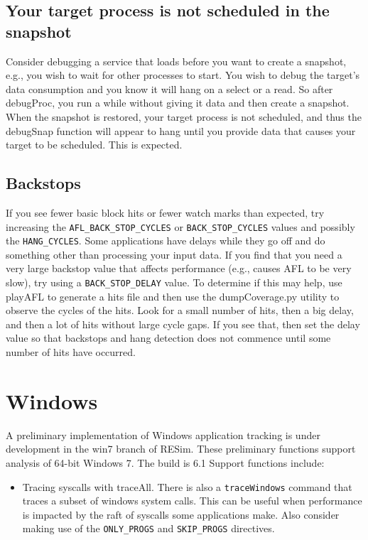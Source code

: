 \documentclass[titlepage]{article}
\begin{document}
\begin{appendices}
\subsection{Your target process is not scheduled in the snapshot}
Consider debugging a service that loads before you want to create a snapshot, e.g., you wish to wait for other processes to start.
You wish to debug the target's data consumption and you know it will hang on a select or a read. So after debugProc, 
you run a while without giving it data and then create a snapshot.  When the snapshot
is restored, your target process is not scheduled, and thus the debugSnap function will appear to hang until you provide data that causes your
target to be scheduled.  This is expected.

\subsection{Backstops}
If you see fewer basic block hits or fewer watch marks than expected, try increasing the {\tt AFL\_BACK\_STOP\_CYCLES} or {\tt BACK\_STOP\_CYCLES} values and possibly the
{\tt HANG\_CYCLES}.  Some applications have delays while they go off and do something other than processing your input data.  If you find that you need a very large backstop
value that affects performance (e.g., causes AFL to be very slow), try using a {\tt BACK\_STOP\_DELAY} value.  To determine if this may help, use 
playAFL to generate a hits file and then use the dumpCoverage.py utility to observe the cycles of the hits.  Look for a small number of hits, then a big delay, and
then a lot of hits without large cycle gaps.  If you see that, then set the delay value so that backstops and hang detection does not commence until some number of hits have
occurred. 

\section{Windows}
\label{Windows}
A preliminary implementation of Windows application tracking is under development in the win7 branch of RESim.
These preliminary functions support analysis of 64-bit Windows 7.  The build is 6.1
Support functions include:
\begin{itemize}
\item Tracing syscalls with traceAll.  There is also a {\tt traceWindows} command that traces a subset of windows system calls.  This can be useful when performance is 
impacted by the raft of syscalls some applications make.  Also consider making use of the {\tt ONLY\_PROGS} and {\tt SKIP\_PROGS} directives.


\end{itemize}
\end{appendices}
\end{document}
